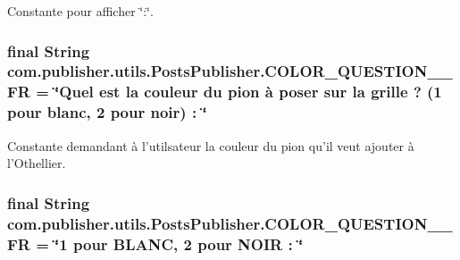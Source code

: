 Constante pour afficher \char`\"{}\-:\char`\"{}. \hypertarget{interfacecom_1_1publisher_1_1utils_1_1PostsPublisher_a6462bf8db5ab80d7a7ea91b6369d9257}{
\subsubsection[{C\-O\-L\-O\-R\-\_\-\-Q\-U\-E\-S\-T\-I\-O\-N\-\_\-1\-\_\-\-F\-R}]{\setlength{\rightskip}{0pt plus 5cm}final String com.\-publisher.\-utils.\-Posts\-Publisher.\-C\-O\-L\-O\-R\-\_\-\-Q\-U\-E\-S\-T\-I\-O\-N\-\_\-\_\-\-F\-R = \char`\"{}Quel est la couleur du pion à poser sur la grille ? (1 pour blanc, 2 pour noir) \-: \char`\"{}\hspace{0.3cm}{\ttfamily [static]}}}\label{interfacecom_1_1publisher_1_1utils_1_1PostsPublisher_a6462bf8db5ab80d7a7ea91b6369d9257}
Constante demandant à l'utilsateur la couleur du pion qu'il veut ajouter à l'Othellier. \hypertarget{interfacecom_1_1publisher_1_1utils_1_1PostsPublisher_a6554d01af8ba346aae5933852277afc3}{
\subsubsection[{C\-O\-L\-O\-R\-\_\-\-Q\-U\-E\-S\-T\-I\-O\-N\-\_\-2\-\_\-\-F\-R}]{\setlength{\rightskip}{0pt plus 5cm}final String com.\-publisher.\-utils.\-Posts\-Publisher.\-C\-O\-L\-O\-R\-\_\-\-Q\-U\-E\-S\-T\-I\-O\-N\-\_\-\_\-\-F\-R = \char`\"{}1 pour B\-L\-A\-N\-C, 2 pour N\-O\-I\-R \-: \char`\"{}\hspace{0.3cm}{\ttfamily [static]}}}\label{interfacecom_1_1publisher_1_1utils_1_1PostsPublisher_a6554d01af8ba346aae5933852277afc3}
